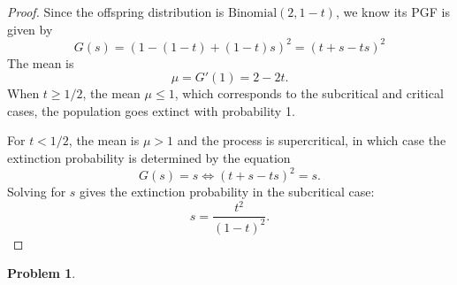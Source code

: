 \documentclass[oneside,reqno]{amsart}
\newcommand{\Bin}{\mathrm{Binomial}}
\theoremstyle{definition}
\newtheorem{prob}{Problem}
\begin{document}
\begin{proof}
Since the offspring distribution is $\Bin(2,1-t)$, we know its PGF is given by
\[
	G(s)  = (1 - (1-t) + (1-t)s)^2 = (t+s - ts)^2
\]
The mean is 
\[
	\mu = G'(1) = 2- 2t.
\]
When $t  \geq 1/2$, the mean $\mu \leq 1$, which corresponds to the subcritical and critical cases, the population goes extinct with probability 1.
\par
For $t < 1/2$, the mean is $\mu > 1$ and the process is supercritical, in which case the extinction probability is determined by the equation
\[
	G(s)=s \iff (t+s - ts)^2 =s.
\] 
Solving for $s$ gives the extinction probability in the subcritical case: 
\[
	s = \frac{t^2}{(1-t)^2}.
\]
\end{proof}

\begin{prob}
\end{prob}
\end{document}
